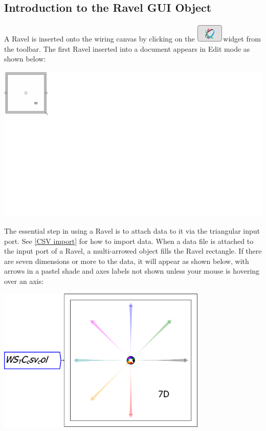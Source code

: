 \subsection{Introduction to the Ravel GUI Object}

\label{Ravel-GUI Object}

A Ravel is inserted onto the wiring canvas by clicking on the \includegraphics{images/RavelWidget}widget
from the toolbar. The first Ravel inserted into a document appears
in Edit mode as shown below:

\includegraphics{images/00RavelBlank}

The essential step in using a Ravel is to attach data to it via the
triangular input port. See \ref{CSV import} for how to import data.
When a data file is attached to the input port of a Ravel, a multi-arrowed
object fills the Ravel rectangle. If there are seven dimensions or
more to the data, it will appear as shown below, with arrows in a
pastel shade and axes labels not shown unless your mouse is hovering
over an axis:

\includegraphics[width=10cm]{images/RavelDataImporting01}

